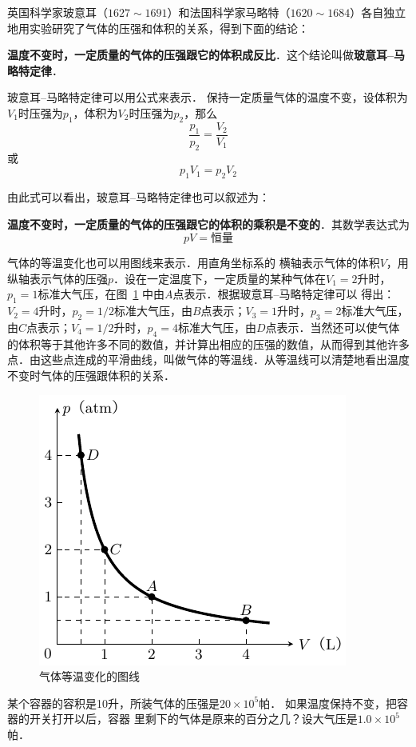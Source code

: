英国科学家玻意耳（$1627 \sim 1691$）和法国科学家马略特（$1620 \sim 1684$）各自独立地用实验研究了气体的压强和体积的关系，得到下面的结论：

\textbf{温度不变时，一定质量的气体的压强跟它的体积成反比}．这个结论叫做\textbf{玻意耳--马略特定律}．

玻意耳--马略特定律可以用公式来表示．
保持一定质量气体的温度不变，设体积为$V_1$时压强为$p_1$，体积为$V_2$时压强为$p_2$，那么
\[\frac{p_1}{p_2}=\frac{V_2}{V_1} \]
或
\[p_1V_1=p_2V_2 \]

由此式可以看出，玻意耳--马略特定律也可以叙述为：

\textbf{温度不变时，一定质量的气体的压强跟它的体积的乘积是不变的}．其数学表达式为
\[pV=\text{恒量}\]

气体的等温变化也可以用图线来表示．用直角坐标系的
横轴表示气体的体积$V$，用纵轴表示气体的压强$p$．设在一定温度下，一定质量的某种气体在$V_1=2$升时，$p_1=1$标准大气压，在图~\ref{fig_B_3-6} 中由$A$点表示．根据玻意耳--马略特定律可以
得出：$V_2=4$升时，$p_2=1/2$标准大气压，由$B$点表示；$V_3=1$升时，$p_3=2$标准大气压，由$C$点表示；$V_4=1/2$升时，$p_4=4$标准大气压，由$D$点表示．当然还可以使气体的体积等于其他许多不同的数值，并计算出相应的压强的数值，从而得到其他许多点．由这些点连成的平滑曲线，叫做气体的等温线．从等温线可以清楚地看出温度不变时气体的压强跟体积的关系．
\begin{figure}[htbp]
    \centering
    \includegraphics{fig/B/3-6.pdf}
    \caption{气体等温变化的图线}\label{fig_B_3-6}
\end{figure}

\begin{example}
某个容器的容积是10升，所装气体的压强是$20\times 10^5$帕．
如果温度保持不变，把容器的开关打开以后，容器
里剩下的气体是原来的百分之几？设大气压是$1.0\times 10^5$帕．
\end{example}

